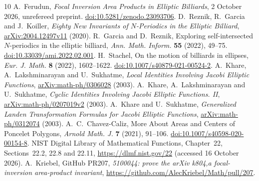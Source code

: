 \documentclass[11pt,letterpaper]{article}
\begin{document}
\begin{thebibliography}{10}
 A.~Ferudun, \emph{Focal Inversion Area Products in
Elliptic Billiards}, 2 October 2026, unrefereed preprint.
\href{https://doi.org/10.5281/zenodo.23093706}{doi:10.5281/zenodo.23093706}.
 D.~Reznik, R.~Garcia and J.~Koiller,
\emph{Eighty New Invariants of $N$-Periodics in the Elliptic Billiard},
\href{https://arxiv.org/abs/2004.12497v11}{arXiv:2004.12497v11} (2020).
 R.~Garcia and D.~Reznik, Exploring self-intersected
$N$-periodics in the elliptic billiard, \emph{Ann. Math. Inform.}
\textbf{55} (2022), 49--75.
\href{https://doi.org/10.33039/ami.2022.02.001}{doi:10.33039/ami.2022.02.001}.
 H.~Stachel, On the motion of billiards in ellipses,
\emph{Eur. J. Math.} \textbf{8} (2022), 1602--1622.
\href{https://doi.org/10.1007/s40879-021-00524-2}{doi:10.1007/s40879-021-00524-2}.
 A.~Khare, A.~Lakshminarayan and U.~Sukhatme,
\emph{Local Identities Involving Jacobi Elliptic Functions},
\href{https://arxiv.org/abs/math-ph/0306028}{arXiv:math-ph/0306028} (2003).
 A.~Khare, A.~Lakshminarayan and U.~Sukhatme,
\emph{Cyclic Identities Involving Jacobi Elliptic Functions. II},
\href{https://arxiv.org/abs/math-ph/0207019v2}{arXiv:math-ph/0207019v2} (2003).
 A.~Khare and U.~Sukhatme,
\emph{Generalized Landen Transformation Formulas for Jacobi Elliptic Functions},
\href{https://arxiv.org/abs/math-ph/0312074}{arXiv:math-ph/0312074} (2003).
 A.~C.~Chavez-Caliz, More About Areas and Centers of
Poncelet Polygons, \emph{Arnold Math. J.} \textbf{7} (2021), 91--106.
\href{https://doi.org/10.1007/s40598-020-00154-8}{doi:10.1007/s40598-020-00154-8}.
 NIST Digital Library of Mathematical Functions,
Chapter~22, Sections~22.2, 22.8 and 22.11,
\url{https://dlmf.nist.gov/22} (accessed 16 October 2026).
 A.~Kriebel, GitHub PR207, \emph{5100044: prove the
arXiv k804,a focal-inversion area-product invariant},
\url{https://github.com/AlecKriebel/Math/pull/207}.
\end{thebibliography}
\end{document}
